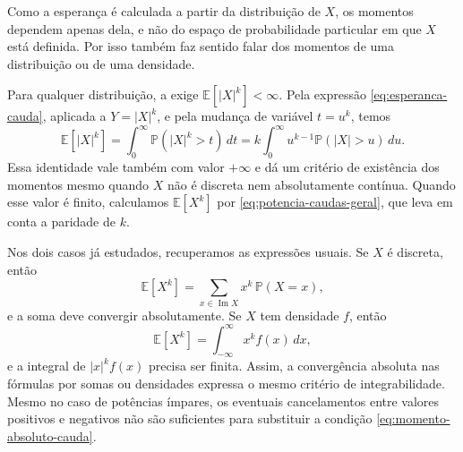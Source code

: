 \documentclass[12pt,portuguese]{article}
\theoremstyle{definition}
\theoremstyle{plainexercise}
\theoremstyle{starredexercise}
\theoremstyle{definition}
\begin{document}
Como a esperança é calculada a partir da distribuição de $X$, os momentos
dependem apenas dela, e não do espaço de probabilidade particular em que $X$
está definida. Por isso também faz sentido falar dos momentos de uma distribuição ou de
uma densidade.

Para qualquer distribuição, a  exige
$\mathbb{E}[|X|^k]<\infty$. Pela expressão \eqref{eq:esperanca-cauda},
aplicada a $Y=|X|^k$, e pela mudança de variável $t=u^k$, temos
\begin{equation}\label{eq:momento-absoluto-cauda}
\mathbb{E}[|X|^k]
=\int_0^\infty\mathbb{P}(|X|^k>t)\,dt
=k\int_0^\infty u^{k-1}\mathbb{P}(|X|>u)\,du.
\end{equation}
Essa identidade vale também com valor $+\infty$ e dá um critério de
existência dos momentos mesmo quando $X$ não é discreta nem absolutamente
contínua. Quando esse valor é finito, calculamos $\mathbb{E}[X^k]$
por \eqref{eq:potencia-caudas-geral}, que leva em conta a paridade de $k$.

Nos dois casos já estudados, recuperamos as expressões usuais. Se $X$ é discreta,
então
\[
\mathbb{E}[X^k]=\sum_{x\in\operatorname{Im}X}x^k\,\mathbb{P}(X=x),
\]
e a soma deve convergir absolutamente. Se $X$ tem densidade $f$, então
\[
\mathbb{E}[X^k]=\int_{-\infty}^{\infty}x^k f(x)\,dx,
\]
e a integral de $|x|^k f(x)$ precisa ser finita. Assim, a convergência absoluta
nas fórmulas por somas ou densidades expressa o mesmo critério de
integrabilidade. Mesmo no caso de potências ímpares, os eventuais
cancelamentos entre valores positivos e negativos não são suficientes para
substituir a condição \eqref{eq:momento-absoluto-cauda}.
\end{document}
